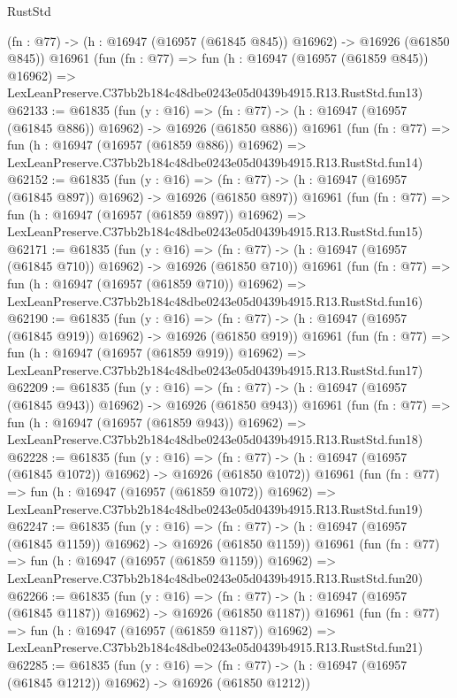 \begin{lexlean}{RustStd}
\begin{coremodule}
    (fn : @77) -> (h : @16947 (@16957 (@61845 @845)) @16962) -> @16926 (@61850 @845))
    @16961
    (fun (fn : @77) =>
    fun (h : @16947 (@16957 (@61859 @845)) @16962) =>
    LexLeanPreserve.C37bb2b184c48dbe0243e05d0439b4915.R13.RustStd.fun13)
@62133 := @61835
    (fun (y : @16) =>
    (fn : @77) -> (h : @16947 (@16957 (@61845 @886)) @16962) -> @16926 (@61850 @886))
    @16961
    (fun (fn : @77) =>
    fun (h : @16947 (@16957 (@61859 @886)) @16962) =>
    LexLeanPreserve.C37bb2b184c48dbe0243e05d0439b4915.R13.RustStd.fun14)
@62152 := @61835
    (fun (y : @16) =>
    (fn : @77) -> (h : @16947 (@16957 (@61845 @897)) @16962) -> @16926 (@61850 @897))
    @16961
    (fun (fn : @77) =>
    fun (h : @16947 (@16957 (@61859 @897)) @16962) =>
    LexLeanPreserve.C37bb2b184c48dbe0243e05d0439b4915.R13.RustStd.fun15)
@62171 := @61835
    (fun (y : @16) =>
    (fn : @77) -> (h : @16947 (@16957 (@61845 @710)) @16962) -> @16926 (@61850 @710))
    @16961
    (fun (fn : @77) =>
    fun (h : @16947 (@16957 (@61859 @710)) @16962) =>
    LexLeanPreserve.C37bb2b184c48dbe0243e05d0439b4915.R13.RustStd.fun16)
@62190 := @61835
    (fun (y : @16) =>
    (fn : @77) -> (h : @16947 (@16957 (@61845 @919)) @16962) -> @16926 (@61850 @919))
    @16961
    (fun (fn : @77) =>
    fun (h : @16947 (@16957 (@61859 @919)) @16962) =>
    LexLeanPreserve.C37bb2b184c48dbe0243e05d0439b4915.R13.RustStd.fun17)
@62209 := @61835
    (fun (y : @16) =>
    (fn : @77) -> (h : @16947 (@16957 (@61845 @943)) @16962) -> @16926 (@61850 @943))
    @16961
    (fun (fn : @77) =>
    fun (h : @16947 (@16957 (@61859 @943)) @16962) =>
    LexLeanPreserve.C37bb2b184c48dbe0243e05d0439b4915.R13.RustStd.fun18)
@62228 := @61835
    (fun (y : @16) =>
    (fn : @77) -> (h : @16947 (@16957 (@61845 @1072)) @16962) -> @16926 (@61850 @1072))
    @16961
    (fun (fn : @77) =>
    fun (h : @16947 (@16957 (@61859 @1072)) @16962) =>
    LexLeanPreserve.C37bb2b184c48dbe0243e05d0439b4915.R13.RustStd.fun19)
@62247 := @61835
    (fun (y : @16) =>
    (fn : @77) -> (h : @16947 (@16957 (@61845 @1159)) @16962) -> @16926 (@61850 @1159))
    @16961
    (fun (fn : @77) =>
    fun (h : @16947 (@16957 (@61859 @1159)) @16962) =>
    LexLeanPreserve.C37bb2b184c48dbe0243e05d0439b4915.R13.RustStd.fun20)
@62266 := @61835
    (fun (y : @16) =>
    (fn : @77) -> (h : @16947 (@16957 (@61845 @1187)) @16962) -> @16926 (@61850 @1187))
    @16961
    (fun (fn : @77) =>
    fun (h : @16947 (@16957 (@61859 @1187)) @16962) =>
    LexLeanPreserve.C37bb2b184c48dbe0243e05d0439b4915.R13.RustStd.fun21)
@62285 := @61835
    (fun (y : @16) =>
    (fn : @77) -> (h : @16947 (@16957 (@61845 @1212)) @16962) -> @16926 (@61850 @1212))

\end{coremodule}
\end{lexlean}
